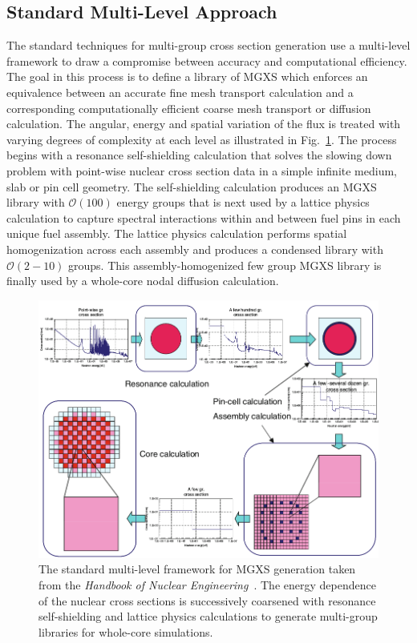 \subsection{Standard Multi-Level Approach}
\label{subsec:chap2-mgxs-lib-std-approach}

The standard techniques for multi-group cross section generation use a multi-level framework to draw a compromise between accuracy and computational efficiency. The goal in this process is to define a library of \ac{MGXS} which enforces an equivalence between an accurate fine mesh transport calculation and a corresponding computationally efficient coarse mesh transport or diffusion calculation. The angular, energy and spatial variation of the flux is treated with varying degrees of complexity at each level as illustrated in Fig.~\ref{fig:chap2-mgxs-process}. The process begins with a resonance self-shielding calculation that solves the slowing down problem with point-wise nuclear cross section data in a simple infinite medium, slab or pin cell geometry. The self-shielding calculation produces an \ac{MGXS} library with $\mathcal{O}(100)$ energy groups that is next used by a lattice physics calculation to capture spectral interactions within and between fuel pins in each unique fuel assembly. The lattice physics calculation performs spatial homogenization across each assembly and produces a condensed library with $\mathcal{O}(2-10)$ groups. This assembly-homogenized few group \ac{MGXS} library is finally used by a whole-core nodal diffusion calculation.

\begin{figure}[h!]
  \centering
  \includegraphics[width=0.9\linewidth]{figures/mgxs/nuke-handbook-mgxs-process}
\caption[Standard multi-level framework for MGXS generation]{The standard multi-level framework for \ac{MGXS} generation taken from the \textit{Handbook of Nuclear Engineering}~\cite{cacuci2010handbook}. The energy dependence of the nuclear cross sections is successively coarsened with resonance self-shielding and lattice physics calculations to generate multi-group libraries for whole-core simulations.}
\label{fig:chap2-mgxs-process}
\end{figure}

